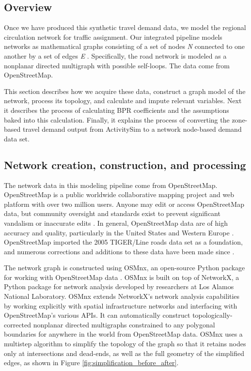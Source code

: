 \subsection{Overview}

Once we have produced this synthetic travel demand data, we model the regional circulation network for traffic assignment. Our integrated pipeline models networks as mathematical graphs consisting of a set of nodes \textit{N} connected to one another by a set of edges \textit{E} \citep{newman_networks:_2010,gastner_spatial_2006}. Specifically, the road network is modeled as a nonplanar directed multigraph with possible self-loops. The data come from OpenStreetMap.

This section describes how we acquire these data, construct a graph model of the network, process its topology, and calculate and impute relevant variables. Next it describes the process of calculating BPR coefficients and the assumptions baked into this calculation. Finally, it explains the process of converting the zone-based travel demand output from ActivitySim to a network node-based demand data set. 

\subsection{Network creation, construction, and processing}

The network data in this modeling pipeline come from OpenStreetMap. OpenStreetMap is a public worldwide collaborative mapping project and web platform with over two million users. Anyone may edit or access OpenStreetMap data, but community oversight and standards exist to prevent significant vandalism or inaccurate edits \citep{jokar_arsanjani_openstreetmap_2015}. In general, OpenStreetMap data are of high accuracy and quality, particularly in the United States and Western Europe \citep{corcoran_analysing_2013,over_generating_2010,haklay_how_2010,maron_how_2015}. OpenStreetMap imported the 2005 TIGER/Line roads data set as a foundation, and numerous corrections and additions to these data have been made since \citep{willis_openstreetmap_2008}.

The network graph is constructed using OSMnx, an open-source Python package for working with OpenStreetMap data \citep{boeing_osmnx:_2017}. OSMnx is built on top of NetworkX, a Python package for network analysis developed by researchers at Los Alamos National Laboratory. OSMnx extends NetworkX's network analysis capabilities by working explicitly with spatial infrastructure networks and interfacing with OpenStreetMap's various APIs. It can automatically construct topologically-corrected nonplanar directed multigraphs constrained to any polygonal boundaries for anywhere in the world from OpenStreetMap data. OSMnx uses a multistep algorithm to simplify the topology of the graph so that it retains nodes only at intersections and dead-ends, as well as the full geometry of the simplified edges, as shown in Figure \ref{fig:simplification_before_after}.

